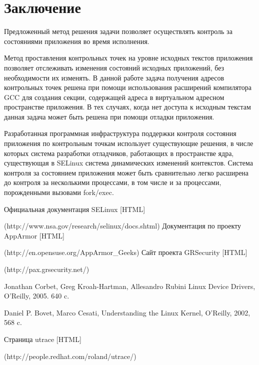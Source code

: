 
\bigskip
\section {Заключение} 

Предложенный метод решения задачи 
позволяет осуществлять контроль за 
состояниями приложения во время исполнения.

Метод проставления контрольных точек
на уровне исходных текстов приложения позволяет 
отслеживать изменения состояний исходных 
приложений, без необходимости их изменять. 
В данной работе задача получения 
адресов контрольных точек решена при помощи 
использования расширений компилятора GCC 
для создания секции, содержащей адреса в 
виртуальном адресном пространстве приложения.
В тех случаях, когда нет доступа к исходным 
текстам данная задача может быть решена при 
помощи отладки приложения. 

Разработанная программная инфраструктура 
поддержки контроля состояния приложения 
по контрольным точкам использует 
существующие решения, в числе которых система 
разработки отладчиков, работающих в пространстве 
ядра, существующая в SELinux система динамических 
изменений контекстов. Система контроля за 
состоянием приложения может быть сравнительно 
легко расширена до контроля за несколькими процессами, 
в том числе и за процессами, порожденными вызовами 
fork/exec. 


\bigskip
\begin{thebibliography}{99}
Официальная документация SELinux [HTML] 

(http://www.nsa.gov/research/selinux/docs.shtml)
Документация по проекту AppArmor [HTML]

(http://en.opensuse.org/AppArmor\_Geeks)
Сайт проекта GRSecurity [HTML] 

(http://pax.grsecurity.net/)

Jonathan Corbet, Greg Kroah-Hartman, Allesandro Rubini Linux Device Drivers, O'Reilly, 2005. 640 c.

Daniel P. Bovet, Marco Cesati, Understanding the Linux Kernel, O'Reilly, 2002, 568 c.
 
Страница utrace [HTML] 

(http://people.redhat.com/roland/utrace/)

\end{thebibliography}
